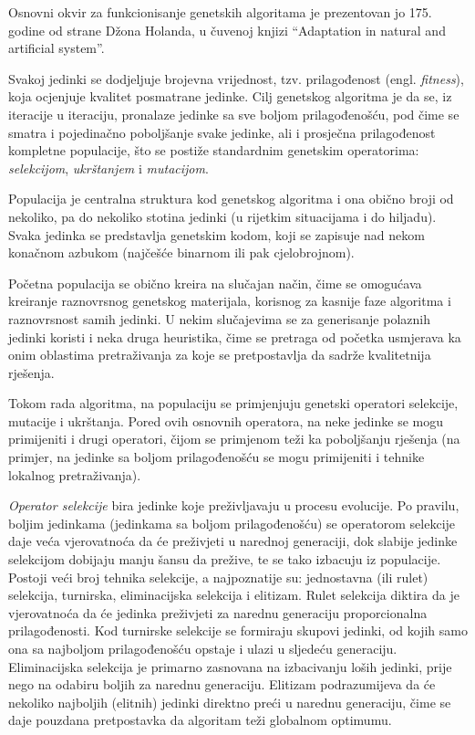 \documentclass[a4paper, utf8, 11pt, colorlinks]{book}
\theoremstyle{definition}
\begin{document}
Osnovni okvir za funkcionisanje genetskih algoritama je prezentovan jo 175. godine od strane Džona Holanda, u čuvenoj knjizi ``Adaptation in natural and artificial system''.

Svakoj jedinki se dodjeljuje brojevna vrijednost, tzv. prilagođenost (engl.  \emph{fitness}), koja ocjenjuje kvalitet posmatrane jedinke. Cilj genetskog algoritma je da se, iz iteracije u iteraciju, pronalaze jedinke sa sve boljom prilagođenošću, pod čime se smatra i pojedinačno poboljšanje svake jedinke, ali i prosječna prilagođenost kompletne populacije, što se postiže standardnim genetskim operatorima: \textit{selekcijom}, \textit{ukrštanjem} i \textit{mutacijom}.

Populacija je centralna struktura kod genetskog algoritma i ona  obično broji od nekoliko, pa do nekoliko stotina jedinki (u rijetkim situacijama i do hiljadu). Svaka jedinka se predstavlja genetskim kodom, koji se zapisuje nad nekom konačnom azbukom (najčešće binarnom ili pak cjelobrojnom).


Početna populacija se obično kreira na slučajan način, čime se omogućava kreiranje raznovrsnog genetskog materijala, korisnog za kasnije faze algoritma i raznovrsnost samih jedinki. U nekim slučajevima se za generisanje polaznih jedinki koristi i neka druga heuristika, čime se pretraga od početka usmjerava ka onim oblastima pretraživanja za koje se pretpostavlja da sadrže kvalitetnija rješenja.

Tokom rada algoritma, na populaciju se primjenjuju genetski operatori selekcije, mutacije i ukrštanja. Pored ovih osnovnih operatora, na neke jedinke se mogu primijeniti i drugi operatori, čijom se primjenom teži ka poboljšanju rješenja (na primjer, na jedinke sa boljom prilagođenošću se mogu primijeniti i tehnike lokalnog  pretraživanja).

\emph{Operator selekcije} bira jedinke koje preživljavaju u procesu evolucije. Po pravilu, boljim jedinkama (jedinkama sa boljom prilagođenošću) se operatorom selekcije daje veća vjerovatnoća da će preživjeti u narednoj generaciji, dok  slabije jedinke selekcijom dobijaju manju šansu da prežive, te se tako izbacuju iz populacije. Postoji veći broj tehnika selekcije, a najpoznatije su: jednostavna (ili rulet) selekcija, turnirska, eliminacijska selekcija i elitizam. Rulet selekcija diktira da je vjerovatnoća da će jedinka preživjeti za narednu generaciju proporcionalna prilagođenosti. Kod turnirske selekcije se formiraju skupovi jedinki, od kojih samo ona sa najboljom prilagođenošću opstaje i ulazi u sljedeću generaciju. Eliminacijska selekcija je primarno zasnovana na izbacivanju loših jedinki, prije nego na odabiru boljih za narednu generaciju. Elitizam podrazumijeva da će nekoliko najboljih (elitnih) jedinki direktno preći u narednu generaciju, čime se daje pouzdana pretpostavka da  algoritam teži globalnom optimumu.
\end{document}
